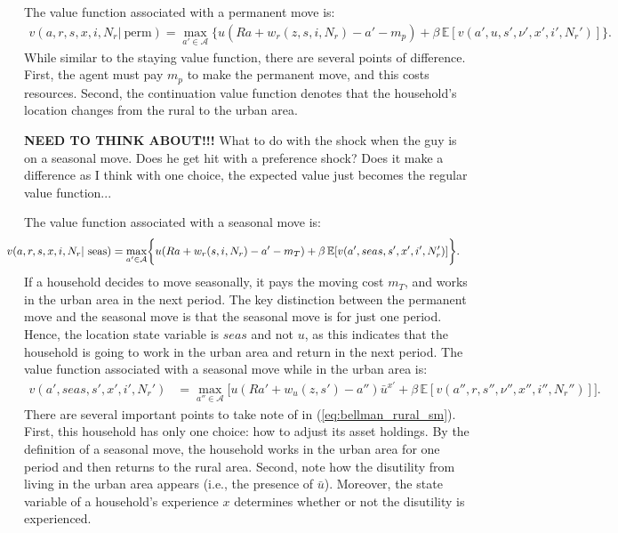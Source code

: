 \documentclass[pdftex,11pt]{article}
\begin{document}
The value function associated with a permanent move is:
\begin{align}
v(a, r, s, x, i, N_r | \ \mbox{perm})  = \max_{a'\in \mathcal{A}} \bigg\{ u(Ra + w_r(z, s, i, N_r) - a' - m_{p} )  + \beta \, \mathbb{E} [v(a',u, s',\nu', x', i',N_r')] \bigg\}.
\nonumber
\end{align}
While similar to the staying value function, there are several points of difference. First, the agent must pay $m_p$ to make the permanent move, and this costs resources. Second, the continuation value function denotes that the household's location changes from the rural to the urban area.

\textbf{NEED TO THINK ABOUT!!!} What to do with the shock when the guy is on a seasonal move. Does he get hit with a preference shock? Does it make a difference as I think with one choice, the expected value just becomes the regular value function...

The value function associated with a seasonal move is:
\begin{align}
\hspace{-0.60cm}v(a, r, s, x, i, N_r | \ \mbox{seas}) = \max_{a'\in \mathcal{A}}&\bigg\{ u(Ra + w_r(s, i, N_r) - a' - m_T ) + \beta \, \mathbb{E} [v(a',seas, s', x', i', N_r')] \bigg\}.
\label{eq:bellman_rural_seas_move}
\end{align}
If a household decides to move seasonally, it pays the moving cost $m_T$, and works in the urban area in the next period. The key distinction between the permanent move and the seasonal move is that the seasonal move is for just one period. Hence, the location state variable is $seas$ and not $u$, as this indicates that the household is going to work in the urban area and return in the next period. The value function associated with a seasonal move while in the urban area is:
\begin{align}
v(a',seas, s',x', i',N_r')&=  \max_{a''\in \mathcal{A}}\bigg[ u(Ra' + w_u(z, s') - a'')\bar u^{x'} + \beta \, \mathbb{E} [v(a'',r, s'', \nu'', x'', i'',N_r'')] \bigg].
\label{eq:bellman_rural_sm}
\end{align}
There are several important points to take note of in (\ref{eq:bellman_rural_sm}). First, this household has only one choice: how to adjust its asset holdings. By the definition of a seasonal move, the household works in the urban area for one period and then returns to the rural area. Second, note how the disutility from living in the urban area appears (i.e., the presence of $\bar u$). Moreover, the state variable of a household's experience $x$ determines whether or not the disutility is experienced.
\end{document}
